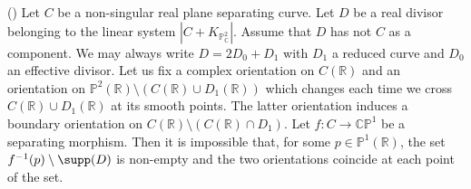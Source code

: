 \begin{thm}(\cite[Theorem 3.2]{Orev21})
\label{thm: stepan}
Let $C$ be a non-singular real plane separating curve. Let $D$ be a real divisor belonging to the linear system $|C+K_{\mathbb P^2_{\mathbb C}}|$. Assume that $D$ has not $C$ as a component. We may always write $D=2D_0 + D_1$ with $D_1$ a reduced curve and $D_0$ an effective divisor. Let us fix a complex orientation on $ C(\mathbb R)$ and an orientation on $\mathbb P^2(\mathbb R) \setminus ( C(\mathbb R) \cup D_1(\mathbb R))$ which changes each time we cross $ C(\mathbb R) \cup D_1(\mathbb R)$ at its smooth points. The latter orientation induces a boundary orientation on $C(\mathbb R) \setminus ( C(\mathbb R) \cap D_1)$. Let $f: C \rightarrow \mathbb C \mathbb P^1$ be a separating morphism. Then it is impossible that, for some $p \in  \mathbb P^1(\mathbb R)$, the set $f^{-1}(p) \setminus \supp(D)$ is non-empty and the two orientations coincide at each point of the set.
\end{thm}


